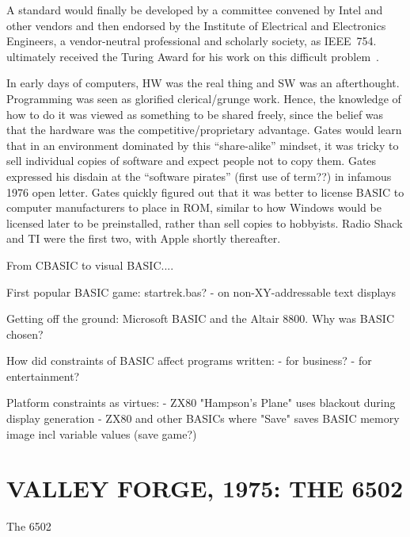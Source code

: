 \documentclass{article}
\begin{document}
  \begin{geeknote}
  A standard would finally be developed by a committee convened by Intel
  and other vendors and then endorsed by the Institute of Electrical and
  Electronics Engineers, a vendor-neutral professional and scholarly
  society, as IEEE~754.   ultimately received the
  Turing Award for his work on this difficult problem~\cite{kahan_interview}.
  \end{geeknote}

In early days of computers, HW was the real thing and SW was an
afterthought.  Programming was seen as glorified clerical/grunge work.
Hence, the knowledge of how to do it was viewed as something to be
shared freely, since the belief was that the hardware was the
competitive/proprietary advantage.
Gates would learn that in an environment dominated by this
``share-alike'' mindset, it was
tricky to sell individual copies of software and expect people not to
copy them.  Gates
expressed his disdain at the ``software pirates'' (first use of term??) in infamous
1976 open letter.
Gates quickly figured out that it was better to license BASIC to
computer manufacturers to place in ROM, similar to how Windows would be
licensed later to be preinstalled, rather than sell copies to
hobbyists.  Radio Shack and TI were the first two, with Apple shortly
thereafter.  

From CBASIC to visual BASIC....


First popular BASIC game: startrek.bas?
  - on non-XY-addressable text displays

Getting off the ground: Microsoft BASIC and the Altair 8800.  Why was
    BASIC chosen?


How did constraints of BASIC affect programs written:
- for business?
- for entertainment?



Platform constraints as virtues:
 - ZX80 "Hampson's Plane" uses blackout during display generation 
 - ZX80 and other BASICs where "Save" saves BASIC memory image incl
 variable values (save game?)

\section{VALLEY FORGE, 1975: THE 6502}

\begin{milestone}{The 6502}

\end{milestone}
\end{document}
